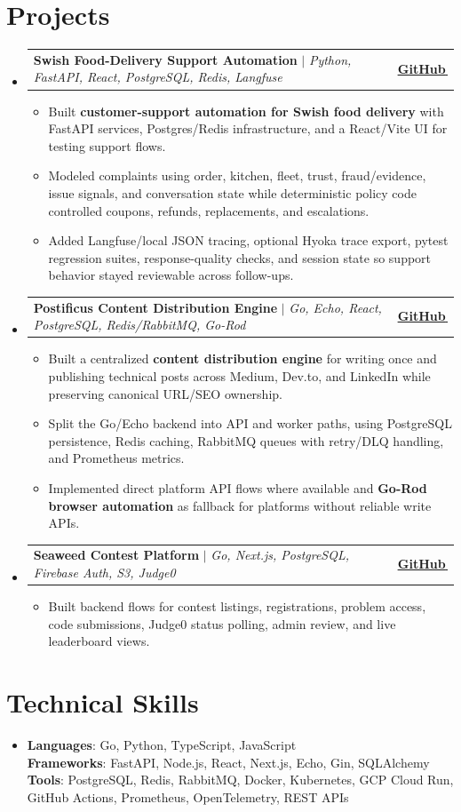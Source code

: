 \documentclass[letterpaper,11pt]{article}
\makeatletter
\newcommand{\bodyhref}[2]{\href{#1}{\underline{#2}\,\faExternalLink*}}
\newcommand{\resumeItem}[1]{\item{\fontsize{8.82pt}{9.28pt}\selectfont #1\vspace{-0.7pt}}}
\newcommand{\resumeProjectHeading}[2]{
    \item
    \begin{tabular*}{1.0\textwidth}{l@{\extracolsep{\fill}}r}
      \small#1 & \textbf{\small #2}\\
    \end{tabular*}\vspace{-4pt}
}
\newcommand{\resumeSubHeadingListStart}{\begin{itemize}[leftmargin=0.0in, label={}, itemsep=0.6pt, topsep=0pt, parsep=0pt, partopsep=0pt]}
\newcommand{\resumeSubHeadingListEnd}{\end{itemize}}
\newcommand{\resumeItemListStart}{\begin{itemize}[leftmargin=0.16in,itemsep=0.3pt,topsep=0.9pt,parsep=0pt,partopsep=0pt]}
\newcommand{\resumeItemListEnd}{\end{itemize}\vspace{-3pt}}
\makeatother
\begin{document}
\section{Projects}
\resumeSubHeadingListStart
\resumeProjectHeading
{\textbf{Swish Food-Delivery Support Automation} $|$ \emph{Python, FastAPI, React, PostgreSQL, Redis, Langfuse}}{\bodyhref{https://github.com/unichronic/swishagent}{GitHub}}
\resumeItemListStart
\resumeItem{Built \textbf{customer-support automation for Swish food delivery} with FastAPI services, Postgres/Redis infrastructure, and a React/Vite UI for testing support flows.}
\resumeItem{Modeled complaints using order, kitchen, fleet, trust, fraud/evidence, issue signals, and conversation state while deterministic policy code controlled coupons, refunds, replacements, and escalations.}
\resumeItem{Added Langfuse/local JSON tracing, optional Hyoka trace export, pytest regression suites, response-quality checks, and session state so support behavior stayed reviewable across follow-ups.}
\resumeItemListEnd
\resumeProjectHeading
{\textbf{Postificus Content Distribution Engine} $|$ \emph{Go, Echo, React, PostgreSQL, Redis/RabbitMQ, Go-Rod}}{\bodyhref{https://github.com/unichronic/postificus}{GitHub}}
\resumeItemListStart
\resumeItem{Built a centralized \textbf{content distribution engine} for writing once and publishing technical posts across Medium, Dev.to, and LinkedIn while preserving canonical URL/SEO ownership.}
\resumeItem{Split the Go/Echo backend into API and worker paths, using PostgreSQL persistence, Redis caching, RabbitMQ queues with retry/DLQ handling, and Prometheus metrics.}
\resumeItem{Implemented direct platform API flows where available and \textbf{Go-Rod browser automation} as fallback for platforms without reliable write APIs.}
\resumeItemListEnd
\resumeProjectHeading
{\textbf{Seaweed Contest Platform} $|$ \emph{Go, Next.js, PostgreSQL, Firebase Auth, S3, Judge0}}{\bodyhref{https://github.com/unichronic/seaweed-fe}{GitHub}}
\resumeItemListStart
\resumeItem{Built backend flows for contest listings, registrations, problem access, code submissions, Judge0 status polling, admin review, and live leaderboard views.}
\resumeItemListEnd
\resumeSubHeadingListEnd

\section{Technical Skills}
\begin{itemize}[leftmargin=0.15in, label={}, topsep=0pt, itemsep=0pt, parsep=0pt, partopsep=0pt]
  \item{\fontsize{9.0pt}{9.25pt}\selectfont
   \textbf{Languages}{: Go, Python, TypeScript, JavaScript} \\
   \textbf{Frameworks}{: FastAPI, Node.js, React, Next.js, Echo, Gin, SQLAlchemy} \\
   \textbf{Tools}{: PostgreSQL, Redis, RabbitMQ, Docker, Kubernetes, GCP Cloud Run, GitHub Actions, Prometheus, OpenTelemetry, REST APIs} \\
  }
\end{itemize}
\end{document}
